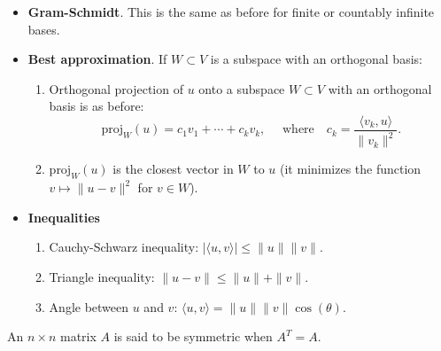 \begin{itemize}
\item[(d)] \textbf{Gram-Schmidt}.
This is the same as before for finite or countably infinite bases.

\item[(e)] \textbf{Best approximation}.
If $W \subset V$ is a subspace with an orthogonal basis:
\begin{enumerate}
    \item Orthogonal projection of $u$ onto a subspace $W \subset V$ with an orthogonal basis is as before:
    \[
    \text{proj}_W(u) = c_1v_1 + \cdots + c_kv_k,    
    \quad \mbox{ where} \quad c_k = \frac{\langle v_k,u \rangle}{\|v_k\|^2}.\]
    \item $\text{proj}_W(u)$ is the closest vector in $W$ to $u$ (it minimizes the function $v \mapsto \|u - v\|^2$ for $v \in W$).
\end{enumerate}

\item[(f)] \textbf{Inequalities}
\begin{enumerate}
    \item Cauchy-Schwarz inequality: \qquad
    $
    |\langle u, v \rangle| \leq \|u\| \|v\|.
    $
    \item Triangle inequality:
    \qquad $    \|u - v\| \leq \|u\| + \|v\|.
    $
    \item Angle between $u$ and $v$: 
    \qquad $
    \langle u, v \rangle = \|u\| \|v\| \cos(\theta).
    $
\end{enumerate}
\end{itemize}

\begin{defn}
An $n \times n$ matrix $A$ is said to be symmetric when $A^T = A.$
\end{defn}

